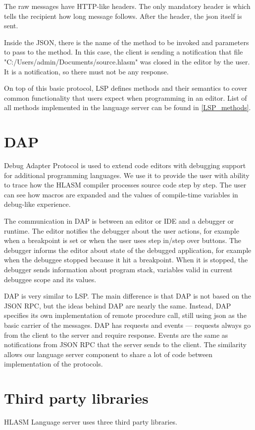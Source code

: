 The raw messages have HTTP-like headers. The only mandatory header is  which tells the recipient how long message follows. After the header, the json itself is sent.

Inside the JSON, there is the name of the method to be invoked and parameters to pass to the method. In this case, the client is sending a notification that file "C:/Users/admin/Documents/source.hlasm" was closed in the editor by the user. It is a notification, so there must not be any response.

On top of this basic protocol, LSP defines methods and their semantics to cover common functionality that users expect when programming in an editor. List of all methods implemented in the language server can be found in \cref{LSP_methods}.

\section{DAP}
Debug Adapter Protocol is used to extend code editors with debugging support for additional programming languages. We use it to provide the user with ability to trace how the HLASM compiler processes source code step by step. The user can see how macros are expanded and the values of compile-time variables in debug-like experience.

The communication in DAP is between an editor or IDE and a debugger or runtime. The editor notifies the debugger about the user actions, for example when a breakpoint is set or when the user uses step in/step over buttons. The debugger informs the editor about state of the debugged application, for example when the debuggee stopped because it hit a breakpoint. When it is stopped, the debugger sends information about program stack, variables valid in current debuggee scope and its values.

DAP is very similar to LSP. The main difference is that DAP is not based on the JSON RPC, but the ideas behind DAP are nearly the same. Instead, DAP specifies its own implementation of remote procedure call, still using json as the basic carrier of the messages. DAP has requests and events --- requests always go from the client to the server and require response. Events are the same as notifications from JSON RPC that the server sends to the client. The similarity allows our language server component to share a lot of code between implementation of the protocols.

\section{Third party libraries}
HLASM Language server uses three third party libraries.

